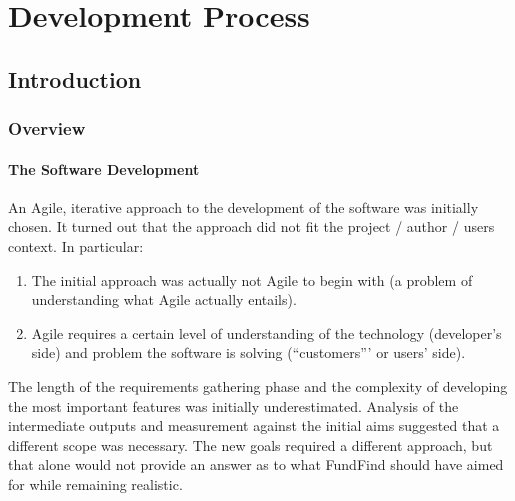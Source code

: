 \chapter{Development Process}



\section{Introduction}


\subsection{Overview}



\subsubsection{The Software Development}
An Agile, iterative approach to the development of the software was initially chosen. It turned out that the approach did not fit the project / author / users context. In particular:

\begin{enumerate}
 \item The initial approach was actually not Agile to begin with (a problem of understanding what Agile actually entails).
 \item Agile requires a certain level of understanding of the technology (developer's side) and problem the software is solving (``customers''' or users' side).
\end{enumerate}

The length of the requirements gathering phase and the complexity of developing the most important features was initially underestimated. Analysis of the intermediate outputs and measurement against the initial aims suggested that a different scope was necessary. The new goals required a different approach, but that alone would not provide an answer as to what FundFind should have aimed for while remaining realistic.

